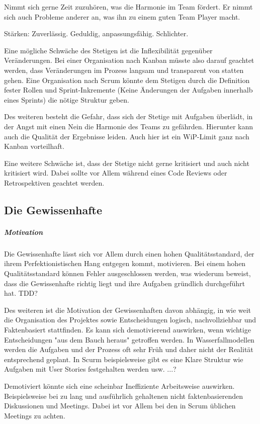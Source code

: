 \documentclass[twocolumn,10pt]{asme2ej}
\begin{document}
Nimmt sich gerne Zeit zuzuhören, was die Harmonie im Team fördert. Er nimmt sich auch Probleme anderer an, was ihn zu einem guten Team Player macht.

Stärken: Zuverlässig. Geduldig, anpassungsfähig. Schlichter. 

Eine mögliche Schwäche des Stetigen ist die Inflexibilität gegenüber Veränderungen. Bei einer Organisation nach Kanban müsste also darauf geachtet werden, dass Veränderungen im Prozess langsam und transparent von statten gehen. Eine Organisation nach Scrum könnte dem Stetigen durch die Definition fester Rollen und Sprint-Inkremente (Keine Änderungen der Aufgaben innerhalb eines Sprints) die nötige Struktur geben.

Des weiteren besteht die Gefahr, dass sich der Stetige mit Aufgaben überlädt, in der Angst mit einen Nein die Harmonie des Teams zu gefährden. Hierunter kann auch die Qualität der Ergebnisse leiden. Auch hier ist ein WiP-Limit ganz nach Kanban vorteilhaft.
 
Eine weitere Schwäche ist, dass der Stetige nicht gerne kritisiert und auch nicht kritisiert wird. Dabei sollte vor Allem während eines Code Reviews oder Retrospektiven geachtet werden.
 


\subsection{Die Gewissenhafte}
\subparagraph{Motivation}

Die Gewissenhafte lässt sich vor Allem durch einen hohen Qualitätsstandard, der ihrem Perfektionistischen Hang entgegen kommt, motivieren. Bei einem hohen Qualitätsstandard können Fehler ausgeschlossen werden, was wiederum beweist, dass die Gewissenhafte richtig liegt und ihre Aufgaben gründlich durchgeführt hat. TDD? 

Des weiteren ist die Motivation der Gewissenhaften davon abhängig, in wie weit die Organisation des Projektes sowie Entscheidungen logisch, nachvollziehbar und Faktenbasiert stattfinden. Es kann sich demotivierend auswirken, wenn wichtige Entscheidungen "aus dem Bauch heraus" getroffen werden. In Wasserfallmodellen werden die Aufgaben und der Prozess oft sehr Früh und daher nicht der Realität entsprechend geplant. In Scurm beispielsweise gibt es eine Klare Struktur wie Aufgaben mit User Stories festgehalten werden usw. ...?

Demotiviert könnte sich eine scheinbar Ineffiziente Arbeitsweise auswirken. Beispielsweise bei zu lang und ausführlich gehaltenen nicht faktenbasierenden Diskussionen und Meetings. Dabei ist vor Allem bei den in Scrum üblichen Meetings zu achten.
\end{document}
